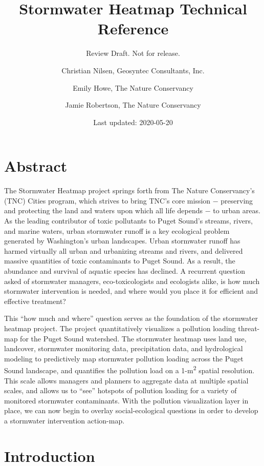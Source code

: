 \documentclass[
]{report}
\title{Stormwater Heatmap Technical Reference}
\subtitle{Review Draft. Not for release.}
\author{Christian Nilsen, Geosyntec Consultants, Inc. \and Emily Howe, The Nature Conservancy \and Jamie Robertson, The Nature Conservancy}
\date{Last updated: 2020-05-20}
\begin{document}
\maketitle

{
\setcounter{tocdepth}{1}
\tableofcontents
}
\hypertarget{abstract}{%
\chapter*{Abstract}\label{abstract}}

The Stormwater Heatmap project springs forth from The Nature Conservancy's (TNC) Cities program, which strives to bring TNC's core mission − preserving and protecting the land and waters upon which all life depends − to urban areas. As the leading contributor of toxic pollutants to Puget Sound's streams, rivers, and marine waters, urban stormwater runoff is a key ecological problem generated by Washington's urban landscapes. Urban stormwater runoff has harmed virtually all urban and urbanizing streams and rivers, and delivered massive quantities of toxic contaminants to Puget Sound. As a result, the abundance and survival of aquatic species has declined. A recurrent question asked of stormwater managers, eco-toxicologists and ecologists alike, is how much stormwater intervention is needed, and where would you place it for efficient and effective treatment?

This ``how much and where'' question serves as the foundation of the stormwater heatmap project. The project quantitatively visualizes a pollution loading threat-map for the Puget Sound watershed. The stormwater heatmap uses land use, landcover, stormwater monitoring data, precipitation data, and hydrological modeling to predictively map stormwater pollution loading across the Puget Sound landscape, and quantifies the pollution load on a 1-m\textsuperscript{2} spatial resolution. This scale allows managers and planners to aggregate data at multiple spatial scales, and allows us to ``see'' hotspots of pollution loading for a variety of monitored stormwater contaminants. With the pollution visualization layer in place, we can now begin to overlay social-ecological questions in order to develop a stormwater intervention action-map.

\hypertarget{introduction}{%
\chapter{Introduction}\label{introduction}}
\end{document}
